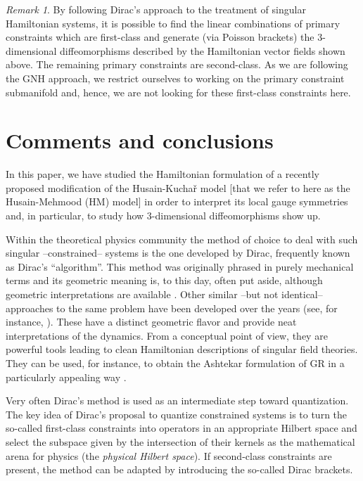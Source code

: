 \documentclass[12pt]{amsart}
\theoremstyle{plain}
\theoremstyle{definition}
\theoremstyle{remark}
\newtheorem{remark}[theorem]{Remark}
\numberwithin{equation}{section}  %
\begin{document}
\begin{remark}
By following Dirac's approach to the treatment of singular Hamiltonian systems, it is possible to find the linear combinations of primary constraints which are first-class and generate (via Poisson brackets) the 3-dimensional diffeomorphisms described by the Hamiltonian vector fields shown above. The remaining primary constraints are second-class. As we are following the GNH approach, we restrict ourselves to working on the primary constraint submanifold and, hence, we are not looking for these first-class constraints here. 
\end{remark}


%
%
\section{Comments and conclusions}{\label{sec_comments}}

In this paper, we have studied the Hamiltonian formulation of a recently proposed modification of the Husain-Kucha\v{r} model [that we refer to here as the Husain-Mehmood (HM) model] in order to interpret its local gauge symmetries and, in particular, to study how 3-dimensional diffeomorphisms show up. 

Within the theoretical physics community the method of choice to deal with such singular --constrained-- systems is the one developed by Dirac, frequently known as Dirac's ``algorithm''. This method was originally phrased in purely mechanical terms and its geometric meaning is, to this day, often put aside, although geometric interpretations are available \cite{BDMV}. Other similar --but not identical-- approaches to the same problem have been developed over the years (see, for instance, \cite{GNH1, GNH2, GNH3, gotay1979presymplectic}). These have a distinct geometric flavor and provide neat interpretations of the dynamics. From a conceptual point of view, they are powerful tools leading to clean Hamiltonian descriptions of singular field theories. They can be used, for instance, to obtain the Ashtekar formulation of GR in a particularly appealing way \cite{Barbero2024}. 

Very often Dirac's method is used as an intermediate step toward quantization. The key idea of Dirac's proposal to quantize constrained systems is to turn the so-called first-class constraints into operators in an appropriate Hilbert space and select the subspace given by the intersection of their kernels as the mathematical arena for physics (the \textit{physical Hilbert space}). If second-class constraints are present, the method can be adapted by introducing the so-called Dirac brackets.
\end{document}
